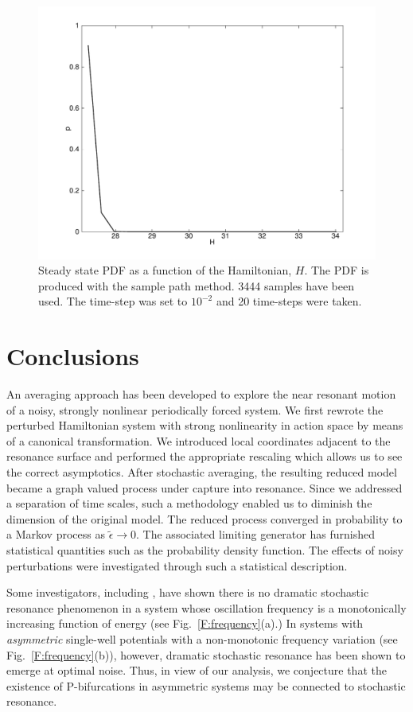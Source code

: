 \begin{figure}
\begin{center}
\includegraphics[width=\textwidth*7/8]{figures/oscillator_steady_state_pdf}
\caption{Steady state PDF as a function of the Hamiltonian, $H$. The PDF is produced with the sample path method. 3444 samples have been used. The time-step was set to $10^{-2}$ and 20 time-steps were taken.}
\label{f:sample pdf}
\end{center}
\end{figure}

\section{Conclusions}

An averaging approach has been developed to explore the near resonant motion of a noisy, strongly nonlinear periodically forced system. We first rewrote the perturbed Hamiltonian system with strong nonlinearity in action space by means of a canonical transformation. We introduced local coordinates adjacent to the resonance surface and performed the appropriate rescaling which allows us to see the correct asymptotics. After stochastic averaging, the resulting reduced model became a graph valued process under capture into resonance. Since we addressed a separation of time scales, such a methodology enabled us to diminish the dimension of the original model. The reduced process converged in probability to a Markov process as $\tilde\epsilon \to 0$. The associated limiting generator has furnished statistical quantities such as the probability density function. The effects of noisy perturbations were investigated through such a statistical description.

Some investigators, including \citet{soskin89:_fluct, soskin92:_evolut}, have shown there is no dramatic stochastic resonance phenomenon in a system whose oscillation frequency is a monotonically increasing function of energy (see Fig.~\ref{F:frequency}(a).) In systems with \emph{asymmetric} single-well potentials with a non-monotonic frequency variation (see Fig.~\ref{F:frequency}(b)), however, dramatic stochastic resonance has been shown to emerge at optimal noise. Thus, in view of our analysis, we conjecture that the existence of P-bifurcations in asymmetric systems may be connected to stochastic resonance.
